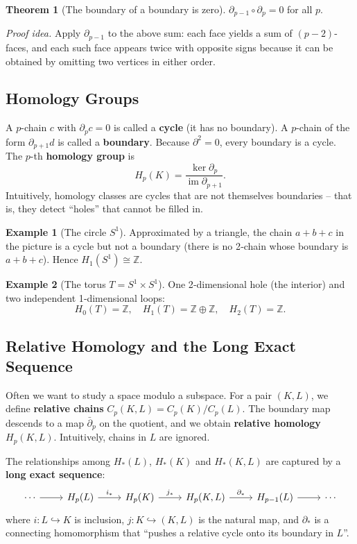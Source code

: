 \documentclass{article}
\theoremstyle{definition}
\newtheorem{example}{Example}[section]
\newtheorem{theorem}{Theorem}[section]
\begin{document}
\begin{theorem}[The boundary of a boundary is zero]
$\partial_{p-1} \circ \partial_p = 0$ for all $p$.
\end{theorem}
\textit{Proof idea.} Apply $\partial_{p-1}$ to the above sum: each face yields a sum of $(p-2)$-faces, and each such face appears twice with opposite signs because it can be obtained by omitting two vertices in either order.

\subsection{Homology Groups}
A $p$-chain $c$ with $\partial_p c = 0$ is called a \textbf{cycle} (it has no boundary).  
A $p$-chain of the form $\partial_{p+1} d$ is called a \textbf{boundary}.  
Because $\partial^2 = 0$, every boundary is a cycle. The $p$-th \textbf{homology group} is
\[
H_p(K) = \frac{\ker \partial_p}{\operatorname{im} \partial_{p+1}}.
\]
Intuitively, homology classes are cycles that are not themselves boundaries – that is, they detect “holes” that cannot be filled in.

\begin{example}[The circle $S^1$]
Approximated by a triangle, the chain $a+b+c$ in the picture is a cycle but not a boundary (there is no 2‑chain whose boundary is $a+b+c$). Hence $H_1(S^1) \cong \mathbb{Z}$.
\end{example}

\begin{example}[The torus $T = S^1 \times S^1$]
One 2‑dimensional hole (the interior) and two independent 1‑dimensional loops:
\[
H_0(T) = \mathbb{Z},\quad H_1(T) = \mathbb{Z}\oplus\mathbb{Z},\quad H_2(T) = \mathbb{Z}.
\]
\end{example}

\subsection{Relative Homology and the Long Exact Sequence}

Often we want to study a space modulo a subspace. For a pair $(K,L)$, we define \textbf{relative chains} $C_p(K,L) = C_p(K)/C_p(L)$. The boundary map descends to a map $\bar{\partial}_p$ on the quotient, and we obtain \textbf{relative homology} $H_p(K,L)$. Intuitively, chains in $L$ are ignored.

The relationships among $H_*(L)$, $H_*(K)$ and $H_*(K,L)$ are captured by a \textbf{long exact sequence}:
\[
\begin{tikzcd}
\cdots \arrow[r] & H_p(L) \arrow[r, "i_*"] & H_p(K) \arrow[r, "j_*"] & H_p(K,L) \arrow[r, "\partial_*"] & H_{p-1}(L) \arrow[r] & \cdots
\end{tikzcd}
\]
where $i:L\hookrightarrow K$ is inclusion, $j:K\hookrightarrow (K,L)$ is the natural map, and $\partial_*$ is a connecting homomorphism that “pushes a relative cycle onto its boundary in $L$”.
\end{document}
